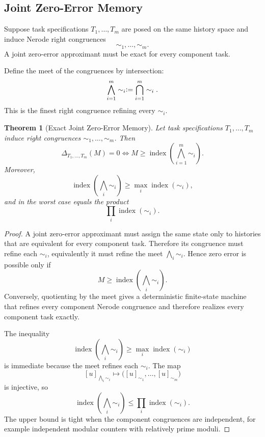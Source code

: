 \documentclass[12pt]{article}
\newtheorem{theorem}{Theorem}[section]
\theoremstyle{definition}
\newcommand{\eqdef}{\vcentcolon=}
\begin{document}
\subsection{Joint Zero-Error Memory}
\label{subsec:joint-zero-error}

Suppose task specifications $T_1,\dots,T_m$ are posed on the same history
space and induce Nerode right congruences
\[
\sim_1,\dots,\sim_m.
\]
A joint zero-error approximant must be exact for every component task.

Define the meet of the congruences by intersection:
\[
\bigwedge_{i=1}^m \sim_i
\eqdef
\bigcap_{i=1}^m \sim_i.
\]
This is the finest right congruence refining every $\sim_i$.

\begin{theorem}[Exact Joint Zero-Error Memory]
\label{thm:joint}
Let task specifications $T_1,\dots,T_m$ induce right congruences
$\sim_1,\dots,\sim_m$.  Then
\[
\Delta_{T_1,\dots,T_m}(M)=0
\iff
M\ge
\operatorname{index}
\left(
\bigwedge_{i=1}^m\sim_i
\right).
\]
Moreover,
\[
\operatorname{index}
\left(
\bigwedge_i\sim_i
\right)
\ge
\max_i\operatorname{index}(\sim_i),
\]
and in the worst case equals the product
\[
\prod_i\operatorname{index}(\sim_i).
\]
\end{theorem}

\begin{proof}
A joint zero-error approximant must assign the same state only to histories
that are equivalent for every component task.  Therefore its congruence must
refine each $\sim_i$, equivalently it must refine the meet
$\bigwedge_i\sim_i$.  Hence zero error is possible only if
\[
M\ge
\operatorname{index}
\left(
\bigwedge_i\sim_i
\right).
\]
Conversely, quotienting by the meet gives a deterministic finite-state machine
that refines every component Nerode congruence and therefore realizes every
component task exactly.

The inequality
\[
\operatorname{index}
\left(
\bigwedge_i\sim_i
\right)
\ge
\max_i\operatorname{index}(\sim_i)
\]
is immediate because the meet refines each $\sim_i$.  The map
\[
[u]_{\bigwedge_i\sim_i}
\mapsto
\bigl(
[u]_{\sim_1},\dots,[u]_{\sim_m}
\bigr)
\]
is injective, so
\[
\operatorname{index}
\left(
\bigwedge_i\sim_i
\right)
\le
\prod_i\operatorname{index}(\sim_i).
\]
The upper bound is tight when the component congruences are independent, for
example independent modular counters with relatively prime moduli.
\end{proof}
\end{document}
